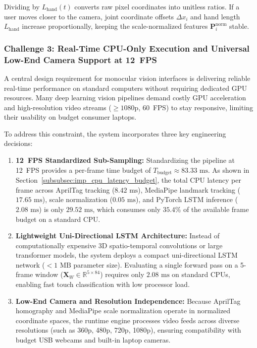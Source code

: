 Dividing by $L_{\text{hand}}(t)$ converts raw pixel coordinates into unitless ratios. If a user moves closer to the camera, joint coordinate offsets $\Delta x_i$ and hand length $L_{\text{hand}}$ increase proportionally, keeping the scale-normalized features $\mathbf{P}_i^{\text{norm}}$ stable.

\subsubsection{Challenge 3: Real-Time CPU-Only Execution and Universal Low-End Camera Support at 12~FPS}
A central design requirement for monocular vision interfaces is delivering reliable real-time performance on standard computers without requiring dedicated GPU resources. Many deep learning vision pipelines demand costly GPU acceleration and high-resolution video streams ($\ge 1080$p, $60$~FPS) to stay responsive, limiting their usability on budget consumer laptops.

To address this constraint, the system incorporates three key engineering decisions:
\begin{enumerate}
    \item \textbf{12~FPS Standardized Sub-Sampling:} Standardizing the pipeline at 12~FPS provides a per-frame time budget of $T_{\text{budget}} \approx 83.33\text{ ms}$. As shown in Section~\ref{subsubsec:imp_cpu_latency_budget}, the total CPU latency per frame across AprilTag tracking ($8.42\text{ ms}$), MediaPipe landmark tracking ($17.65\text{ ms}$), scale normalization ($0.05\text{ ms}$), and PyTorch LSTM inference ($2.08\text{ ms}$) is only $29.52\text{ ms}$, which consumes only $35.4\%$ of the available frame budget on a standard CPU.
    \item \textbf{Lightweight Uni-Directional LSTM Architecture:} Instead of computationally expensive 3D spatio-temporal convolutions or large transformer models, the system deploys a compact uni-directional LSTM network ($< 1\text{ MB}$ parameter size). Evaluating a single forward pass on a 5-frame window ($\mathbf{X}_W \in \mathbb{R}^{5 \times 84}$) requires only $2.08\text{ ms}$ on standard CPUs, enabling fast touch classification with low processor load.
    \item \textbf{Low-End Camera and Resolution Independence:} Because AprilTag homography and MediaPipe scale normalization operate in normalized coordinate spaces, the runtime engine processes video feeds across diverse resolutions (such as 360p, 480p, 720p, 1080p), ensuring compatibility with budget USB webcams and built-in laptop cameras.
\end{enumerate}

